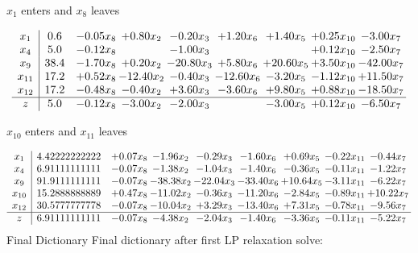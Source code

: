 \documentclass[8pt]{article}
\begin{document}
 $ x_{1} $ enters and $ x_{8} $ leaves 

 \[\begin{array}{c| c c@{\hskip 2pt} c@{\hskip 2pt} c@{\hskip 2pt} c@{\hskip 2pt} c@{\hskip 2pt} c@{\hskip 2pt} c@{\hskip 2pt} }
 x_{1}   &  0.6 & -0.05 x_{8} & +  0.80 x_{2} & -0.20 x_{3} & +  1.20 x_{6} & +  1.40 x_{5} & +  0.25 x_{10} & -3.00 x_{7}\\
 x_{4}   &  5.0 & -0.12 x_{8} &   & -1.00 x_{3} &    &   & +  0.12 x_{10} & -2.50 x_{7}\\
 x_{9}   &  38.4 & -1.70 x_{8} & +  0.20 x_{2} & -20.80 x_{3} & +  5.80 x_{6} & + 20.60 x_{5} & +  3.50 x_{10} & -42.00 x_{7}\\
 x_{11}   &  17.2 & +  0.52 x_{8} & -12.40 x_{2} & -0.40 x_{3} & -12.60 x_{6} & -3.20 x_{5} & -1.12 x_{10} & + 11.50 x_{7}\\
 x_{12}   &  17.2 & -0.48 x_{8} & -0.40 x_{2} & +  3.60 x_{3} & -3.60 x_{6} & +  9.80 x_{5} & +  0.88 x_{10} & -18.50 x_{7}\\
\hline
z    &  5.0 & -0.12 x_{8} & -3.00 x_{2} & -2.00 x_{3} &   & -3.00 x_{5} & +  0.12 x_{10} & -6.50 x_{7}\\
\end{array}\]


 $ x_{10} $ enters and $ x_{11} $ leaves 

 \[\begin{array}{c| c c@{\hskip 2pt} c@{\hskip 2pt} c@{\hskip 2pt} c@{\hskip 2pt} c@{\hskip 2pt} c@{\hskip 2pt} c@{\hskip 2pt} }
 x_{1}   &  4.42222222222 & +  0.07 x_{8} & -1.96 x_{2} & -0.29 x_{3} & -1.60 x_{6} & +  0.69 x_{5} & -0.22 x_{11} & -0.44 x_{7}\\
 x_{4}   &  6.91111111111 & -0.07 x_{8} & -1.38 x_{2} & -1.04 x_{3} & -1.40 x_{6} & -0.36 x_{5} & -0.11 x_{11} & -1.22 x_{7}\\
 x_{9}   &  91.9111111111 & -0.07 x_{8} & -38.38 x_{2} & -22.04 x_{3} & -33.40 x_{6} & + 10.64 x_{5} & -3.11 x_{11} & -6.22 x_{7}\\
 x_{10}   &  15.2888888889 & +  0.47 x_{8} & -11.02 x_{2} & -0.36 x_{3} & -11.20 x_{6} & -2.84 x_{5} & -0.89 x_{11} & + 10.22 x_{7}\\
 x_{12}   &  30.5777777778 & -0.07 x_{8} & -10.04 x_{2} & +  3.29 x_{3} & -13.40 x_{6} & +  7.31 x_{5} & -0.78 x_{11} & -9.56 x_{7}\\
\hline
z    &  6.91111111111 & -0.07 x_{8} & -4.38 x_{2} & -2.04 x_{3} & -1.40 x_{6} & -3.36 x_{5} & -0.11 x_{11} & -5.22 x_{7}\\
\end{array}\]
Final Dictionary
Final dictionary after first LP relaxation solve: 
\end{document}
